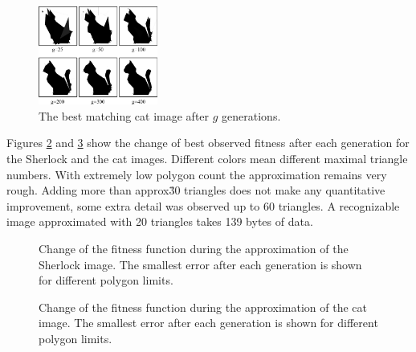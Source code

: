 \documentclass[conference]{IEEEtran}
\begin{document}
\begin{figure}[htbp]
	\centering
	\includegraphics[width=0.35\textwidth]{fig/cat6.png}
	\caption{The best matching cat image after $g$ generations.}
	\label{cat-6}
\end{figure}

Figures \ref{curve-sherlock} and \ref{curve-cat} show the change
of best observed fitness after each generation for the Sherlock
and the cat images. Different colors mean different maximal
triangle numbers. With extremely low polygon count the approximation
remains very rough. Adding more than approx\. 30 triangles
does not make any quantitative improvement, some extra detail
was observed up to 60 triangles. A recognizable image approximated
with 20 triangles takes 139 bytes of data.

\begin{figure}[htbp]
	\centering
		\resizebox{.45\textwidth}{!}{}
	\caption{Change of the fitness function during the approximation of the Sherlock image.
	The smallest error after each generation is shown for different polygon limits.} %
	\label{curve-sherlock}
\end{figure}

\begin{figure}[htbp]
	\centering
		\resizebox{.45\textwidth}{!}{}
	\caption{Change of the fitness function during the approximation of the cat image.
	The smallest error after each generation is shown for different polygon limits.}
	\label{curve-cat}
\end{figure}
\end{document}
